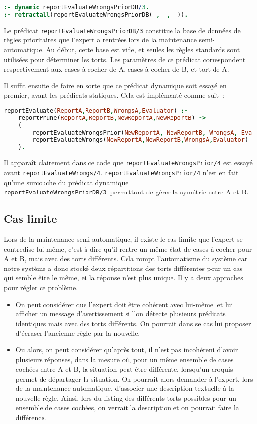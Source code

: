 \begin{lstlisting}[language=Prolog,frame=single]
:- dynamic reportEvaluateWrongsPriorDB/3.
:- retractall(reportEvaluateWrongsPriorDB(_, _, _)).
\end{lstlisting}

Le prédicat \texttt{reportEvaluateWrongsPriorDB/3} constitue la base de données de règles prioritaires que l'expert a rentrées lors de la maintenance semi-automatique. Au début, cette base est vide, et seules les règles standards sont utilisées pour déterminer les torts. Les paramètres de ce prédicat correspondent respectivement aux cases à cocher de A, cases à cocher de B, et tort de A.

Il suffit ensuite de faire en sorte que ce prédicat dynamique soit essayé en premier, avant les prédicats statiques. Cela est implémenté comme suit~:

\begin{lstlisting}[language=Prolog,frame=single]
reportEvaluate(ReportA,ReportB,WrongsA,Evaluator) :-
    reportPrune(ReportA,ReportB,NewReportA,NewReportB) ->
	(
		reportEvaluateWrongsPrior(NewReportA, NewReportB, WrongsA, Evaluator) ;
		reportEvaluateWrongs(NewReportA,NewReportB,WrongsA,Evaluator)
	).
\end{lstlisting}

Il apparaît clairement dans ce code que \texttt{reportEvaluateWrongsPrior/4} est essayé avant \texttt{reportEvaluateWrongs/4}. \texttt{reportEvaluateWrongsPrior/4} n'est en fait qu'une surcouche du prédicat dynamique \texttt{reportEvaluateWrongsPriorDB/3} permettant de gérer la symétrie entre A et B.

\subsection{Cas limite}
Lors de la maintenance semi-automatique, il existe le cas limite que l'expert se contredise lui-même, c'est-à-dire qu'il rentre un même état de cases à cocher pour A et B, mais avec des torts différents. Cela rompt l'automatisme du système car notre système a donc stocké deux répartitions des torts différentes pour un cas qui semble être le même, et la réponse n'est plus unique. Il y a deux approches pour régler ce problème.
\begin{itemize}
	\item On peut considérer que l'expert doit être cohérent avec lui-même, et lui afficher un message d'avertissement si l'on détecte plusieurs prédicats identiques mais avec des torts différents. On pourrait dans se cas lui proposer d'écraser l'ancienne règle par la nouvelle.
	\item Ou alors, on peut considérer qu'après tout, il n'est pas incohérent d'avoir plusieurs réponses, dans la mesure où, pour un même ensemble de cases cochées entre A et B, la situation peut être différente, lorsqu'un croquis permet de départager la situation. On pourrait alors demander à l'expert, lors de la maintenance automatique, d'associer une description textuelle à la nouvelle règle. Ainsi, lors du listing des différents torts possibles pour un ensemble de cases cochées, on verrait la description et on pourrait faire la différence.\\
\end{itemize}

